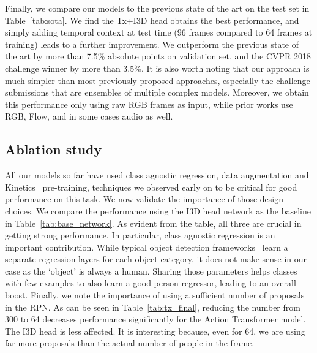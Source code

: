 \documentclass[10pt,twocolumn,letterpaper]{article}
\newcommand{\Tx}[0]{Action Transformer}
\begin{document}
Finally, we compare our models to the previous state of the art on the test set in Table~\ref{tab:sota}.
We find the Tx+I3D head obtains the best performance, and simply adding temporal context at test time (96 frames compared to 64 frames at training) leads to a further improvement. We outperform the previous state of the art by more than 7.5\% absolute points on validation set, and the CVPR 2018 challenge winner by more than 3.5\%.  It is also worth noting that our approach is much simpler than most previously proposed approaches, especially the challenge submissions that are ensembles of multiple complex models. Moreover, we obtain this performance only using raw RGB frames as input, while prior works 
use RGB, Flow, and in some cases audio as well.

\subsection{Ablation study}\label{sec:exp:tx_ablate}



All our models so far have used class agnostic regression, data augmentation and Kinetics~\cite{kay2017kinetics} pre-training, techniques we observed early on to
be critical for good performance on this task.
We now validate the importance of those
design choices.
We compare the performance using the I3D head network as the baseline in Table~\ref{tab:base_network}. As evident from the table, all three are crucial in getting strong performance. In particular, class agnostic regression is an important
contribution. While typical object detection frameworks~\cite{he2017mask,huang2017speed} learn a separate regression layers for each object category, it does not make sense in our case as the `object' is always a human. Sharing those parameters helps classes with few examples to also learn a good person regressor, leading to an overall boost.
Finally, we note the importance of using a sufficient number of proposals in the RPN. As can be seen 
in
Table~\ref{tab:tx_final}, reducing the number from 
300 to 64 decreases performance significantly
for the  \Tx{} model. The I3D head is less affected. It is interesting because, even for 64, we are using far more proposals than the actual number of people in the frame.
\end{document}
